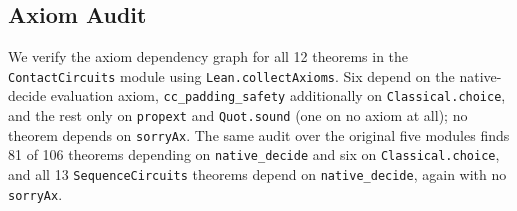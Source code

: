 \subsection{Axiom Audit}
We verify the axiom dependency graph for all 12 theorems in the
\texttt{ContactCircuits} module using \texttt{Lean.collectAxioms}.  Six
depend on the native-decide evaluation axiom, \texttt{cc\_padding\_safety}
additionally on \texttt{Classical.choice}, and the rest only on
\texttt{propext} and \texttt{Quot.sound} (one on no axiom at all); no theorem
depends on \texttt{sorryAx}.  The same audit over the original five modules finds
81 of 106 theorems depending on \texttt{native\_decide} and six on
\texttt{Classical.choice}, and all 13 \texttt{SequenceCircuits} theorems depend on
\texttt{native\_decide}, again with no \texttt{sorryAx}.
